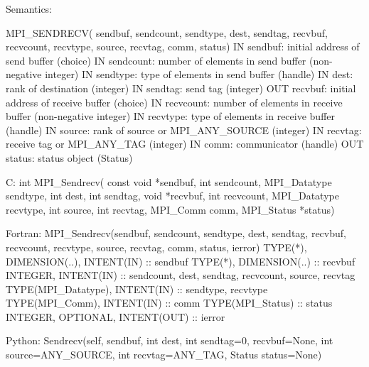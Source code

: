 Semantics:

MPI_SENDRECV(
    sendbuf, sendcount, sendtype, dest, sendtag, 
    recvbuf, recvcount, recvtype, source, recvtag,
    comm, status)
IN sendbuf: initial address of send buffer (choice)
IN sendcount: number of elements in send buffer (non-negative integer)
IN sendtype: type of elements in send buffer (handle)
IN dest: rank of destination (integer)
IN sendtag: send tag (integer)
OUT recvbuf: initial address of receive buffer (choice)
IN recvcount: number of elements in receive buffer (non-negative integer)
IN recvtype: type of elements in receive buffer (handle)
IN source: rank of source or MPI_ANY_SOURCE (integer)
IN recvtag: receive tag or MPI_ANY_TAG (integer)
IN comm: communicator (handle)
OUT status: status object (Status)

C:
int MPI_Sendrecv(
    const void *sendbuf, int sendcount, MPI_Datatype sendtype,
    int dest, int sendtag,
    void *recvbuf, int recvcount, MPI_Datatype recvtype,
    int source, int recvtag,
    MPI_Comm comm, MPI_Status *status)

Fortran:
MPI_Sendrecv(sendbuf, sendcount, sendtype, dest, sendtag, recvbuf,
recvcount, recvtype, source, recvtag, comm, status, ierror)
TYPE(*), DIMENSION(..), INTENT(IN) :: sendbuf
TYPE(*), DIMENSION(..) :: recvbuf
INTEGER, INTENT(IN) :: sendcount, dest, sendtag, recvcount, source,
recvtag
TYPE(MPI_Datatype), INTENT(IN) :: sendtype, recvtype
TYPE(MPI_Comm), INTENT(IN) :: comm
TYPE(MPI_Status) :: status
INTEGER, OPTIONAL, INTENT(OUT) :: ierror

Python:
Sendrecv(self, sendbuf, int dest, int sendtag=0,
    recvbuf=None, int source=ANY_SOURCE, int recvtag=ANY_TAG,
    Status status=None)
